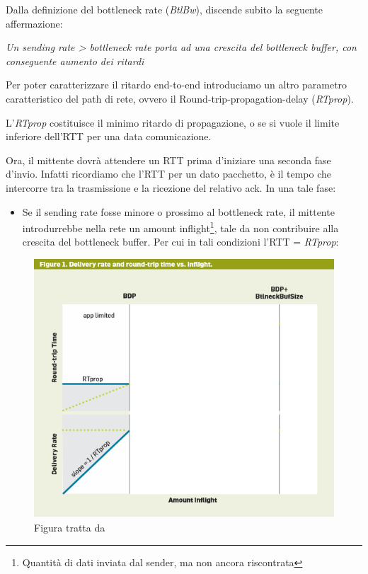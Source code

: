 Dalla definizione del bottleneck rate (\textit{BtlBw}), discende subito la seguente affermazione:

\begin{center}
\label{sending_bottleneck_cons}
\textit{Un sending rate > bottleneck rate porta ad una crescita del bottleneck buffer, con conseguente aumento dei ritardi}
\end{center}

Per poter caratterizzare il ritardo end-to-end introduciamo un altro parametro caratteristico del path di rete, ovvero il Round-trip-propagation-delay (\textit{RTprop}). \bigskip

L'\textit{RTprop} costituisce il minimo ritardo di propagazione, o se si vuole il limite inferiore dell'RTT per una data comunicazione. \bigskip

Ora, il mittente dovrà attendere un RTT prima d'iniziare una seconda fase d'invio. Infatti ricordiamo che l'RTT per un dato pacchetto, è il tempo che intercorre tra la trasmissione e la ricezione del relativo ack. In una tale fase:

\begin{itemize}

\item Se il sending rate fosse minore o prossimo al bottleneck rate, il mittente introdurrebbe nella rete un amount inflight\footnote{Quantità di dati inviata dal sender, ma non ancora riscontrata}, tale da non contribuire alla crescita del bottleneck buffer. Per cui in tali condizioni l'RTT = \textit{RTprop}:

\end{itemize}

\begin{figure}[H]

\center
\caption{Delivery rate and round trip time vs inflight part 1}
\label{Delivery_rate_round_trip_time_part_1}
\includegraphics[scale=0.8]{chapters/failed/img/Delivery_rate_round_trip_time_part_1}
\caption*{Figura tratta da \cite[p.~60]{Cardwell:2017:BCC:3042068.3009824}}

\end{figure}

